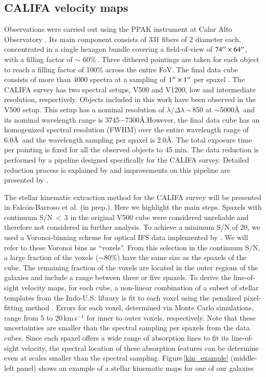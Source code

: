 \documentclass[longauth,traditabstract]{aa}
\begin{document}
\subsection{CALIFA velocity maps}
\label{sec:vel_fields}
Observations were carried out using the PPAK instrument at Calar Alto
Observatory \citep{2005PASP..117..620R}. Its main component consists of 331
fibers of 2 diameter each, concentrated in a single hexagon bundle
covering a field-of-view of $74^{\prime\prime}\times64^{\prime\prime}$, with a filling factor of
$\sim$ 60\%\,. Three dithered pointings are taken for each object to reach a filling factor of 100\% across the entire FoV. The final data cube consists of more than 4000 spectra at a sampling of $1^{\prime\prime}\times1^{\prime\prime}$ per spaxel \cite[see details in][]{Husemann_12}. The CALIFA survey has two spectral setups, V500 and V1200, low and intermediate resolution, respectively. Objects included in this work have been observed in the V500 setup. This setup has a nominal resolution of $\lambda$/$\Delta\lambda$\,$\sim$\,850 at $\sim$5000\AA\ and its nominal wavelength range is 3745$-$7300\AA.However, the final data cube has an homogenized spectral resolution (FWHM) over the entire wavelength range of 6.0\AA\ and the wavelength sampling per spaxel is 2.0\AA. The total exposure time per pointing is fixed for all the observed objects to 45 min. The data reduction is performed by a pipeline designed specifically for the CALIFA survey. Detailed reduction process is explained by \cite{2012A&A...538A...8S} and improvements on this pipeline are presented by \cite{Husemann_12}. 

The stellar kinematic extraction method for the CALIFA survey will be presented in Falc\'{o}n-Barroso et al. (in prep.). Here we highlight the main steps. Spaxels with continuum S/N\,$<$\,3 in the original V500 cube were considered unreliable and therefore not considered in further analysis. To achieve a minimum S/N of 20, we used a Voronoi-binning scheme for optical IFS data implemented by \cite{2003MNRAS.342..345C}. We will refer to these Voronoi bins as ``voxels''. From this selection in the continuum S/N, a large fraction of the voxels ($\sim$80\%) have the same size as the spaxels of the cube. The remaining fraction of the voxels are located in the outer regions of the galaxies and include a range between three or five spaxels. To derive the line-of-sight velocity maps, for each cube, a non-linear combination of a subset of stellar templates from the Indo-U.S. library \citep{2004ApJS..152..251V} is fit to each voxel using the penalized pixel-fitting method \citep[pPXF,][]{2004PASP..116..138C}.  Errors for each voxel, determined via Monte Carlo simulations, range from 5 to 20\,km\,s$^{-1}$ for inner to outer voxels, respectively. Note that these uncertainties are smaller than the spectral sampling per spaxels from the data cubes. Since each spaxel offers a wide range of absorption lines to fit its line-of-sight velocity, the spectral location of these absorption features can be determine even at scales smaller than the spectral sampling.  Figure\,\ref{kin_example} (middle-left panel) shows an example of a stellar kinematic maps for one of our galaxies
\end{document}
